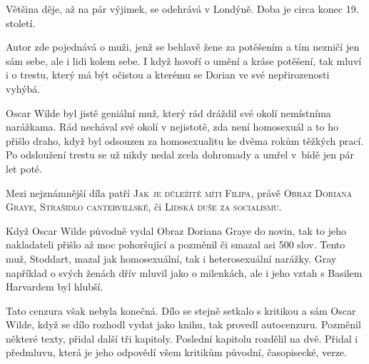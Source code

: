 \documentclass{extarticle} %
\begin{document}
\noindent 
Většina děje, až na pár výjimek, se odehrává v Londýně. Doba je circa konec 19. století.

\noindent 
Autor zde pojednává o muži, jenž se behlavě žene za potěšením a tím nezničí jen sám sebe, ale i lidi kolem sebe.
I když hovoří o umění a kráse potěšení, tak mluví i o trestu, který má být očistou a kterému se Dorian ve své nepřirozenosti vyhýbá.






\noindent 
Oscar Wilde byl jistě geniální muž, který rád dráždil své okolí nemístníma narážkama.
Rád nechával své okolí v nejistotě, zda není homosexuál a to ho přišlo draho, když byl odsouzen za homosexualitu ke dvěma rokům těžkých prací.
Po odsloužení trestu se už nikdy nedal zcela dohromady a umřel v~bídě jen pár let poté.


\noindent 
Mezi nejznámnější díla patří \textsc{Jak je důležité míti Filipa}, právě \textsc{Obraz Doriana Graye}, \textsc{Strašidlo cantervillské}, či \textsc{Lidská duše za socialismu}.



\noindent
Když Oscar Wilde původně vydal Obraz Doriana Graye do novin, tak to jeho nakladateli přišlo až moc pohoršující a pozměnil či smazal asi 500 slov.
Tento muž, Stoddart, mazal jak homosexuální, tak i heterosexuální narážky.
Gray například o svých ženách dřív mluvil jako o milenkách, ale i jeho vztah s Basilem Harvardem byl hlubší.

\noindent
Tato cenzura však nebyla konečná.
Dílo se stejně setkalo s kritikou a sám Oscar Wilde, když se dílo rozhodl vydat jako knihu, tak provedl autocenzuru.
Pozměnil některé texty, přidal další tři kapitoly. Poslední kapitolu rozdělil na dvě. Přidal i předmluvu, která je jeho odpovědí všem kritikům původní, časopisecké, verze.
\end{document}
